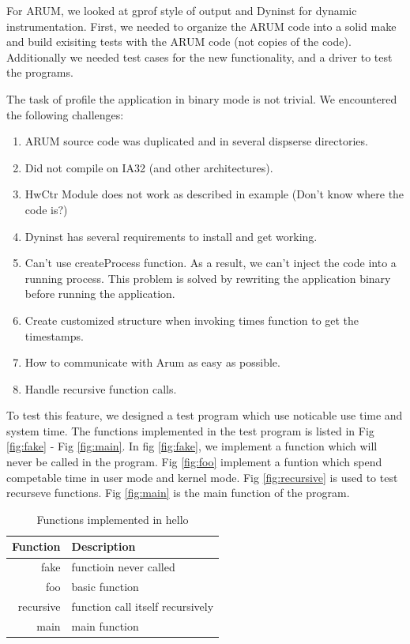 \documentclass[11pt,letterpaper,oneside]{article}
\begin{document}
For ARUM, we looked at gprof style of output and Dyninst for dynamic instrumentation.  First, we needed to organize the ARUM code into a solid make and build exisiting tests with the ARUM code (not copies of the code).   Additionally we needed test cases for the new functionality, and a driver to test the programs.

The task of profile the application in binary mode is not trivial. We encountered the following challenges:
\begin{enumerate}
\item ARUM source code was duplicated and in several dispserse directories.  
\item Did not compile on IA32 (and other architectures).
\item HwCtr Module does not work as described in example (Don't know where the code is?)
\item Dyninst has several requirements to install and get working.
\item Can't use createProcess function. As a result, we can't inject the code into a running process. This problem is solved by rewriting the application binary before running the application.
\item Create customized structure when invoking times function to get the timestamps.
\item How to communicate with Arum as easy as possible.
\item Handle recursive function calls.
\end{enumerate}

To test this feature, we designed a test program which use noticable use time and system time. The functions implemented in the test program is listed in Fig \ref{fig:fake} - Fig \ref{fig:main}. In fig \ref{fig:fake}, we implement a function which will never be called in the program. Fig \ref{fig:foo} implement a funtion which spend competable time in user mode and kernel mode. Fig \ref{fig:recursive} is used to test recurseve functions. Fig \ref{fig:main} is the main function of the program.

\begin{table}[th]
\caption{Functions implemented in hello}
\centering
\begin{tabular}{rl}
\hline
Function & Description \\
\hline
fake & functioin never called \\
foo  & basic function \\
recursive & function call itself recursively \\
main & main function \\
\hline
\end{tabular}
\label{table:mutatee}
\end{table}
\end{document}
